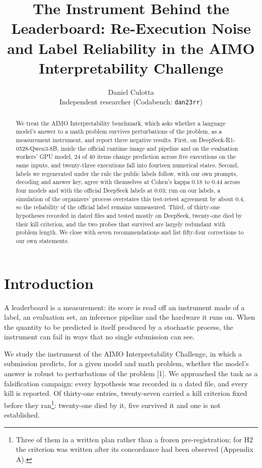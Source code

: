 \documentclass{article}
\title{The Instrument Behind the Leaderboard: Re-Execution Noise and Label Reliability in the AIMO Interpretability Challenge}
\author{%
  Daniel Culotta \\
  Independent researcher (Codabench: \texttt{dan23rr})
}
\begin{document}
\maketitle

\begin{abstract}
We treat the AIMO Interpretability benchmark, which asks whether a language model's answer to a math problem survives perturbations of the problem, as a measurement instrument, and report three negative results. First, on DeepSeek-R1-0528-Qwen3-8B, inside the official runtime image and pipeline and on the evaluation workers' GPU model, 24 of 40 items change prediction across five executions on the same inputs, and twenty-three executions fall into fourteen numerical states. Second, labels we regenerated under the rule the public labels follow, with our own prompts, decoding and answer key, agree with themselves at Cohen's kappa 0.18 to 0.44 across four models and with the official DeepSeek labels at 0.03; run on our labels, a simulation of the organizers' process overstates this test-retest agreement by about 0.4, so the reliability of the official label remains unmeasured. Third, of thirty-one hypotheses recorded in dated files and tested mostly on DeepSeek, twenty-one died by their kill criterion, and the two probes that survived are largely redundant with problem length. We close with seven recommendations and list fifty-four corrections to our own statements.
\end{abstract}

\section{Introduction}\label{sec:1}

A leaderboard is a measurement: its score is read off an instrument made of a label, an evaluation set, an inference pipeline and the hardware it runs on. When the quantity to be predicted is itself produced by a stochastic process, the instrument can fail in ways that no single submission can see.

We study the instrument of the AIMO Interpretability Challenge, in which a submission predicts, for a given model and math problem, whether the model's answer is robust to perturbations of the problem [1]. We approached the task as a falsification campaign: every hypothesis was recorded in a dated file, and every kill is reported. Of thirty-one entries, twenty-seven carried a kill criterion fixed before they ran\footnote{Three of them in a written plan rather than a frozen pre-registration; for H2 the criterion was written after its concordance had been observed (Appendix A).}: twenty-one died by it, five survived it and one is not established.
\end{document}
